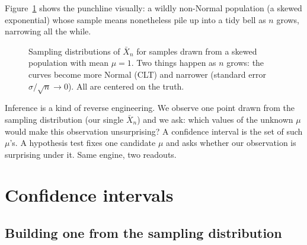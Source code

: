Figure~\ref{ch32:fig-sampling} shows the punchline visually: a wildly non-Normal
population (a skewed exponential) whose sample means nonetheless pile up into a tidy
bell as $n$ grows, narrowing all the while.

\begin{figure}[H]
\centering
{}
\caption{Sampling distributions of $\bar X_n$ for samples drawn from a skewed
population with mean $\mu=1$. Two things happen as $n$ grows: the curves become more
Normal (CLT) and narrower (standard error $\sigma/\sqrt n \to 0$). All are centered on
the truth.}
\label{ch32:fig-sampling}
\end{figure}

\begin{happeningbox}
Inference is a kind of reverse engineering. We observe one point drawn from the
sampling distribution (our single $\bar X_n$) and we ask: which values of the unknown
$\mu$ would make this observation unsurprising? A confidence interval is the set of
such $\mu$'s. A hypothesis test fixes one candidate $\mu$ and asks whether our
observation is surprising under it. Same engine, two readouts.
\end{happeningbox}

\section{Confidence intervals}
\label{ch32:ci}

\subsection{Building one from the sampling distribution}

